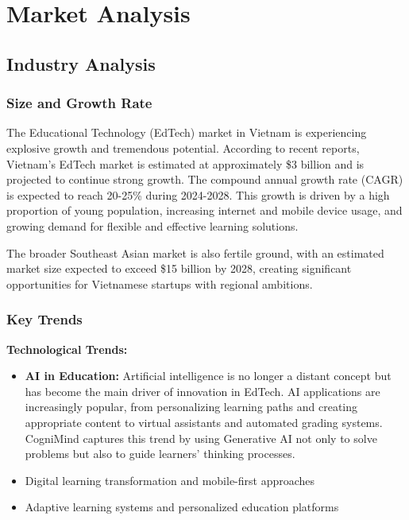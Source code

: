 \section{Market Analysis}

\subsection{Industry Analysis}
\subsubsection{Size and Growth Rate}
The Educational Technology (EdTech) market in Vietnam is experiencing explosive growth and tremendous potential. According to recent reports, Vietnam's EdTech market is estimated at approximately \$3 billion and is projected to continue strong growth. The compound annual growth rate (CAGR) is expected to reach 20-25\% during 2024-2028. This growth is driven by a high proportion of young population, increasing internet and mobile device usage, and growing demand for flexible and effective learning solutions.

The broader Southeast Asian market is also fertile ground, with an estimated market size expected to exceed \$15 billion by 2028, creating significant opportunities for Vietnamese startups with regional ambitions.

\subsubsection{Key Trends}
\textbf{Technological Trends:}
\begin{itemize}
    \item \textbf{AI in Education:} Artificial intelligence is no longer a distant concept but has become the main driver of innovation in EdTech. AI applications are increasingly popular, from personalizing learning paths and creating appropriate content to virtual assistants and automated grading systems. CogniMind captures this trend by using Generative AI not only to solve problems but also to guide learners' thinking processes.
    \item Digital learning transformation and mobile-first approaches
    \item Adaptive learning systems and personalized education platforms
\end{itemize}

